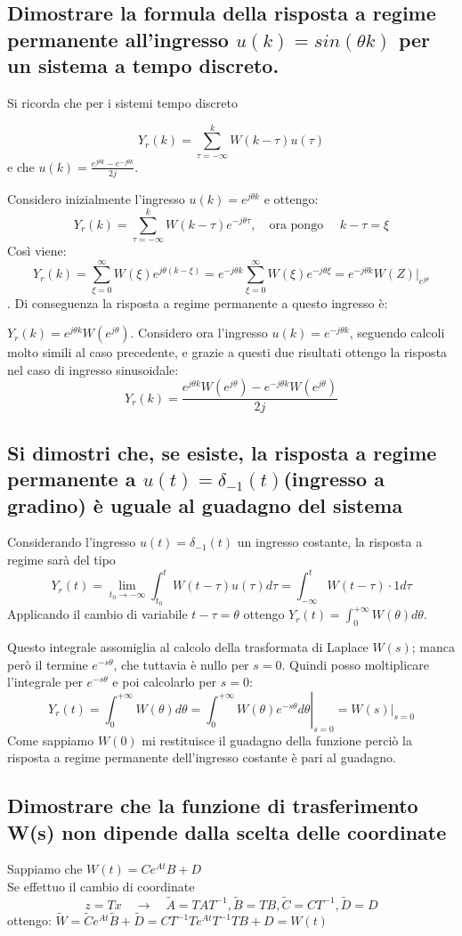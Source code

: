 \documentclass{article}
\begin{document}
\subsection{\boldmath Dimostrare la formula della risposta a regime permanente all'ingresso $u(k) = sin(\theta k)$ per un sistema a tempo discreto.}
Si ricorda che per i sistemi tempo discreto

\[Y_r(k)=\sum_{\tau =- \infty}^{k} W(k-\tau)u(\tau)\]e che $u(k)=\frac {e^{j\theta k} - e^{-j\theta k}}{2j} $.


Considero inizialmente l'ingresso $u(k)=e^{j \theta k}$ e ottengo:
\[ 
    Y_r(k)=\sum_{\tau =- \infty}^{k} W(k-\tau)e^{-j\theta \tau}, \quad \text{ora pongo }\quad k-\tau=\xi
\]
Così viene:
\[ Y_r(k)=\sum_{\xi =0}^{\infty} W(\xi)e^{j\theta (k-\xi)} = e^{-j\theta k} \sum_{\xi =0}^{\infty} W(\xi)e^{-j\theta \xi}
= e^{-j\theta k} W(Z)|_{e^{j \theta}} \].
Di conseguenza la risposta a regime permanente a questo ingresso è:

$Y_r(k)=e^{j \theta k}W(e^{j \theta})$.
Considero ora l'ingresso $u(k)=e^{-j \theta k}$, seguendo calcoli molto simili al caso precedente,
e grazie a questi due risultati ottengo la risposta
nel caso di ingresso sinusoidale:
\[
    Y_r(k)=\frac{e^{j \theta k}W(e^{j \theta})-e^{-j \theta k}W(e^{j \theta})}{2j}
\]
\subsection{\boldmath Si dimostri che, se esiste, la risposta a regime permanente a $u(t) = \delta _{-1}(t)$(ingresso a gradino) è uguale al guadagno del sistema}
Considerando l'ingresso $u(t) = \delta_{-1}(t)$ un ingresso costante,
la risposta a regime sarà del tipo 
\[ 
    Y_r(t)= \lim_{t_0 \to -\infty} \int_{t_0}^{t}W(t-\tau)u(\tau)d\tau=\int_{-\infty}^{t}W(t-\tau)\cdot 1 d\tau
\]
Applicando il cambio di variabile $t-\tau = \theta$ ottengo $Y_r(t)=\int_{0}^{+\infty}W(\theta) d\theta$.

Questo integrale assomiglia al calcolo della trasformata di Laplace $W(s)$;
manca però il termine $e^{-s\theta}$, che tuttavia è nullo per $s=0$.
Quindi posso moltiplicare l'integrale per  $e^{-s\theta}$ e poi calcolarlo per $s=0$:
\[ 
    Y_r(t)=\int_{0}^{+\infty}W(\theta) d\theta =\left. \int_{0}^{+\infty}W(\theta) e^{-s\theta} d\theta \right|_{s=0} =\left. W(s)\right|_{s=0}
\]
Come sappiamo $W(0)$ mi restituisce il guadagno della funzione perciò la risposta a regime permanente dell'ingresso costante è pari al guadagno.

\subsection{Dimostrare che la funzione di trasferimento W(s) non dipende dalla scelta delle coordinate}
Sappiamo che $W(t) = Ce^{At}B+D$\\
Se effettuo il cambio di coordinate 
\[ z=Tx \quad \to \quad \widetilde{A}=TAT^{-1}, \widetilde{B}=TB, \widetilde{C}=CT^{-1}, \widetilde{D}=D\]
ottengo:
$\widetilde{W}=\widetilde{C}e^{At}\widetilde{B}+\widetilde{D}=CT^{-1}Te^{At}T^{-1}TB+D=W(t)$
\end{document}
